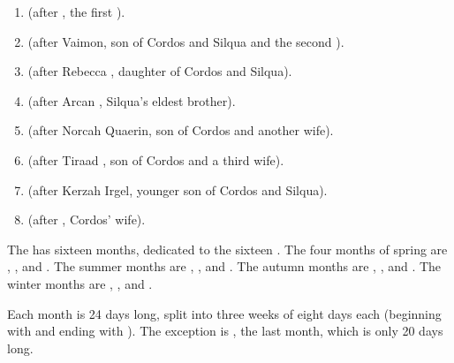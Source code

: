 \begin{gloss}
\begin{subgloss}
  \begin{enumerate}
    \item 
      \Corjin{} (after , the first \VaimonCaliph).
    \item 
      \Zetherab{} (after \Zether Vaimon, son of Cordos and Silqua and the second \caliph).
    \item 
      \Rebecab{} (after Rebecca , daughter of Cordos and Silqua).
    \item 
      \Arcab{} (after Arcan \Delaen, Silqua's eldest brother).
    \item 
      \Norquin{} (after Norcah Quaerin, son of Cordos and another wife).
    \item 
      \Tirjin{} (after Tiraad , son of Cordos and a third wife).
    \item 
      \Kerzab{} (after Kerzah Irgel, younger son of Cordos and Silqua).
    \item 
      \Siljin{} (after , Cordos' wife). 
  \end{enumerate}
  
  
  
  
  
  
  
  \begin{comment}
  \subparagraph{months}
  \end{comment}
  
  The \ImperialCalendar{} has sixteen months, dedicated to the sixteen \Sephiroth{}.
  The four months of spring are \Atzirah{}, \Razilah, \Keshirah{} and \Feazirah{}. 
  The summer months are \Barion{}, \Teshiron, \Izion{} and \Hapheron. 
  The autumn months are \Thimared, \Yemared, \Cushed{} and \Hoshied. 
  The winter months are \Omariel, \Yeziel, \Ishiel{} and \Gamishiel. 
  
  Each month is 24 days long, split into three weeks of eight days each (beginning with \Corjin{} and ending with \Siljin). 
  The exception is \Gamishiel{}, the last month, which is only 20 days long. %
  \also{\Sephiroth}
\end{subgloss}









\end{gloss}
